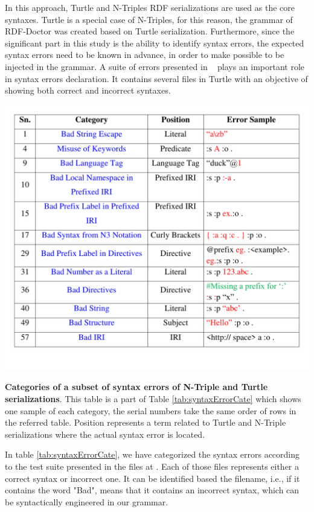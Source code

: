 In this approach, Turtle and N-Triples RDF serializations are used as the core syntaxes. 
Turtle is a special case of N-Triples, for this reason, the grammar of RDF-Doctor was created based on Turtle serialization. 
Furthermore, since the significant part in this study is the ability to identify syntax errors, the expected syntax errors need to be known in advance, in order to make possible to be injected in the grammar. 
A suite of errors presented in ~\cite{TurtleTests:Online} plays an important role in syntax errors declaration. 
It contains several files in Turtle with an objective of showing both correct and incorrect syntaxes.

 \begin{table}[tbp]
 	\centering
\includegraphics[width=5.5in]{images/TrimmedBigTable.pdf}
		\setlength\abovecaptionskip{-10mm}
	\caption{\textbf{Categories of a subset of syntax errors of N-Triple and Turtle serializations}.
	This table is a part of Table \ref{tab:syntaxErrorCate} which shows one sample of each category, the serial numbers take the same order of rows in the referred table. 
	Position represents a term related to Turtle and N-Triple serializations where the actual syntax error is located.}
	\label{tab:trimmedTable}
\end{table}


In table \ref{tab:syntaxErrorCate}, we have categorized the syntax errors according to the test suite presented in the files at \cite{TurtleTests:Online}. 
Each of those files represents either a correct syntax or incorrect one.
It can be identified based the filename, i.e., if it contains the word "Bad", means that it contains an incorrect syntax, which can be syntactically engineered in our grammar.

